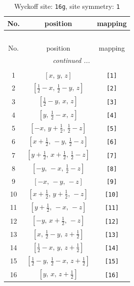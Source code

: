 \documentclass[fleqn,8pt]{jsarticle}
\begin{document}
\begin{longtable}{ccc}
\caption{Wyckoff site: {\tt 16g}, site symmetry: {\tt 1}}
 \\
 \hline \hline
No. & position & mapping \\ \hline \endfirsthead

\multicolumn{2}{l}{\tablename\ \thetable{}} \\
 \hline \hline
No. & position & mapping \\ \hline \endhead

 \hline \hline
\multicolumn{2}{r}{\footnotesize\it continued ...} \\ \endfoot

 \hline \hline
\multicolumn{2}{r}{} \\ \endlastfoot

1 & $\left[ x,\, y,\, z \right]$ & {\tt [1]} \\ \hline
2 & $\left[ \frac{1}{2} - x,\, \frac{1}{2} - y,\, z \right]$ & {\tt [2]} \\ \hline
3 & $\left[ \frac{1}{2} - y,\, x,\, z \right]$ & {\tt [3]} \\ \hline
4 & $\left[ y,\, \frac{1}{2} - x,\, z \right]$ & {\tt [4]} \\ \hline
5 & $\left[ - x,\, y + \frac{1}{2},\, \frac{1}{2} - z \right]$ & {\tt [5]} \\ \hline
6 & $\left[ x + \frac{1}{2},\, - y,\, \frac{1}{2} - z \right]$ & {\tt [6]} \\ \hline
7 & $\left[ y + \frac{1}{2},\, x + \frac{1}{2},\, \frac{1}{2} - z \right]$ & {\tt [7]} \\ \hline
8 & $\left[ - y,\, - x,\, \frac{1}{2} - z \right]$ & {\tt [8]} \\ \hline
9 & $\left[ - x,\, - y,\, - z \right]$ & {\tt [9]} \\ \hline
10 & $\left[ x + \frac{1}{2},\, y + \frac{1}{2},\, - z \right]$ & {\tt [10]} \\ \hline
11 & $\left[ y + \frac{1}{2},\, - x,\, - z \right]$ & {\tt [11]} \\ \hline
12 & $\left[ - y,\, x + \frac{1}{2},\, - z \right]$ & {\tt [12]} \\ \hline
13 & $\left[ x,\, \frac{1}{2} - y,\, z + \frac{1}{2} \right]$ & {\tt [13]} \\ \hline
14 & $\left[ \frac{1}{2} - x,\, y,\, z + \frac{1}{2} \right]$ & {\tt [14]} \\ \hline
15 & $\left[ \frac{1}{2} - y,\, \frac{1}{2} - x,\, z + \frac{1}{2} \right]$ & {\tt [15]} \\ \hline
16 & $\left[ y,\, x,\, z + \frac{1}{2} \right]$ & {\tt [16]} \\
\end{longtable}
\end{document}
